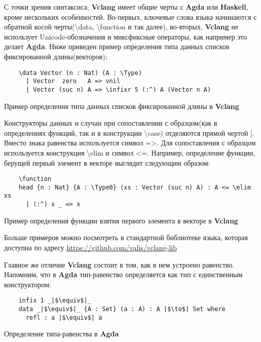 С точки зрения синтаксиса, \textbf{Vclang} имеет общие черты с \textbf{Agda} или \textbf{Haskell}, кроме нескольких особенностей. Во-первых, ключевые слова языка начинаются с обратной косой черты(\textbackslash{}data, \textbackslash{}function и так далее), во-вторых, \textbf{Vclang} не использует Unicode-обозначения и миксфиксные операторы, как например это делает \textbf{Agda}. Ниже приведен пример определения типа данных списков фиксированной длины(векторов):

\begin{listing}[H]
  \begin{verbatim}
    \data Vector (n : Nat) (A : \Type)
      | Vector  zero   A => vnil
      | Vector (suc n) A => \infixr 5 (:^) A (Vector n A)
  \end{verbatim}
\caption{Пример определения типа данных списков фиксированной длины в \textbf{Vclang}}
\end{listing}

Конструкторы данных и случаи при сопоставлении с образцом(как в определениях функций, так и в конструкции \textbackslash{}case) отделяются прямой чертой |. Вместо знака равенства используется символ =>. Для сопоставления с образцом используется конструкция \textbackslash{}elim и символ <=. Например, определение функции, берущей первый элемент в векторе выглядит следующим образом:

\begin{listing}[H]
  \begin{verbatim}
    \function
    head {n : Nat} {A : \Type0} (xs : Vector (suc n) A) : A <= \elim xs
      | (:^) x _ => x
  \end{verbatim}
\caption{Пример определения функции взятия первого элемента в векторе в \textbf{Vclang}}
\end{listing}

 Больше примеров можно посмотреть в стандартной библиотеке языка, которая доступна по адресу \url{https://github.com/valis/vclang-lib}

Главное же отличие \textbf{Vclang} состоит в том, как в нем устроено равенство. Напомним, что в \textbf{Agda} тип-равенство определяется как тип с единственным конструктором:

\begin{listing}[H]
  \begin{verbatim}
    infix 1 _|$\equiv$|_
    data _|$\equiv$|_ {A : Set} (a : A) : A |$\to$| Set where
      refl : a |$\equiv$| a
  \end{verbatim}
\caption{Определение типа-равенства в \textbf{Agda}}
\end{listing}

